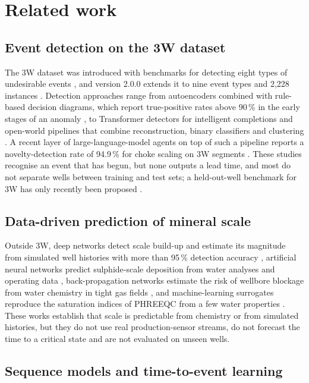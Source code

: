 \section{Related work}\label{sec:related}

\subsection{Event detection on the 3W dataset}

The 3W dataset was introduced with benchmarks for detecting eight types of undesirable events
\citep{vargas2019}, and version 2.0.0 extends it to nine event types and 2,228 instances \citep{vargas2026}.
Detection approaches range from autoencoders combined with rule-based decision diagrams, which report
true-positive rates above 90\,\% in the early stages of an anomaly \citep{aranha2024}, to Transformer
detectors for intelligent completions \citep{aranha2025} and open-world pipelines that combine
reconstruction, binary classifiers and clustering \citep{lopes2025}. A recent layer of large-language-model
agents on top of such a pipeline reports a novelty-detection rate of 94.9\,\% for choke scaling on 3W
segments \citep{lopes2026}. These studies recognise an event that has begun, but none outputs a lead time,
and most do not separate wells between training and test sets; a held-out-well benchmark for 3W has only
recently been proposed \citep{issue231}.

\subsection{Data-driven prediction of mineral scale}

Outside 3W, deep networks detect scale build-up and estimate its magnitude from simulated well histories with
more than 95\,\% detection accuracy \citep{cheng2022}, artificial neural networks predict sulphide-scale
deposition from water analyses and operating data \citep{askar2025}, back-propagation networks estimate the
risk of wellbore blockage from water chemistry in tight gas fields \citep{su2024}, and machine-learning
surrogates reproduce the saturation indices of PHREEQC \citep{parkhurst2013} from a few water properties
\citep{molina2025}. These works establish that scale is predictable from chemistry or from simulated
histories, but they do not use real production-sensor streams, do not forecast the time to a critical
state and are not evaluated on unseen wells.

\subsection{Sequence models and time-to-event learning}

